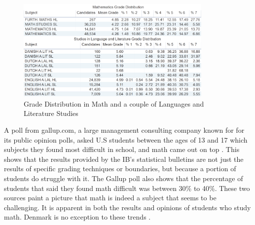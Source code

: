 \begin{figure}[H]
\centering
    \includegraphics[width=0.85\textwidth]{figures/grade_distribution.png}
    \caption{Grade Distribution in Math and a couple of Languages and Literature Studies \cite{Baccalaureate2018TheSession}}
    \label{fig:grade_distribution}
\end{figure}

\noindent
A poll from gallup.com, a large management consulting company known for for its public opinion polls, asked U.S students between the ages of 13 and 17 which subjects they found most difficult in school, and math came out on top \cite{MathTeens}. This shows that the results provided by the IB's statistical bulletins are not just the results of specific grading techniques or boundaries, but because a portion of students do struggle with it. The Gallup poll also shows that the percentage of students that said they found math difficult was between 30\% to 40\%. 
\newline\newline
These two sources paint a picture that math is indeed a subject that seems to be challenging. It is apparent in both the results and opinions of students who study math. Denmark is no exception to these trends \cite{JessenMatematikudredningen}. 

